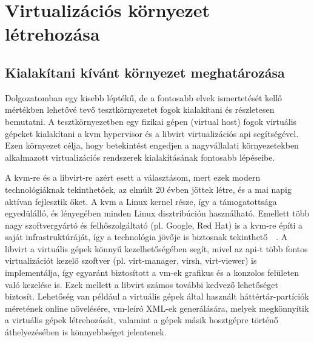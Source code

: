 
\chapter{Virtualizációs környezet létrehozása}
\label{chap:testenv}

\section{Kialakítani kívánt környezet meghatározása}
Dolgozatomban egy kisebb léptékű, de a fontosabb elvek ismertetését kellő mértékben lehetővé tevő tesztkörnyezetet fogok kialakítani és részletesen bemutatni. A tesztkörnyezetben egy fizikai gépen (virtual host) fogok virtuális gépeket kialakítani a \acrshort{kvm} \gls{hypervisor} és a \gls{libvirt} virtualizációs \acrshort{api} segítségével. Ezen környezet célja, hogy betekintést engedjen a nagyvállalati környezetekben alkalmazott virtualizációs rendszerek kialakításának fontosabb lépéseibe.

A \acrshort{kvm}-re és a \gls{libvirt}-re azért esett a választásom, mert ezek modern technológiáknak tekinthetőek, az elmúlt 20 évben jöttek létre, és a mai napig aktívan fejlesztik őket. A \acrshort{kvm} a Linux kernel része, így a támogatottsága egyedülálló, és lényegében minden Linux disztribúción használható. Emellett több nagy szoftvergyártó és felhőszolgáltató (pl. Google, Red Hat) is a \acrshort{kvm}-re építi a saját infrastruktúráját, így a technológia jövője is biztosnak tekinthető~\cite{RedHatVirtKVM}~\cite{GoogleCloudKVM}. A \gls{libvirt} a virtuális gépek könnyű kezelhetőségében segít, mivel az \acrshort{api}-t több fontos virtualizációt kezelő szoftver (pl. virt-manager, virsh, virt-viewer) is implementálja, így egyaránt biztosított a \acrshort{vm}-ek grafikus és a konzolos felületen való kezelése is.
Ezek mellett a \gls{libvirt} számos további kedvező lehetőséget biztosít. Lehetőség van például a virtuális gépek által használt háttértár-partíciók méretének online növelésére, \acrshort{vm}-leíró XML-ek generálására, melyek megkönnyítik a virtuális gépek létrehozását, valamint a gépek másik hosztgépre történő áthelyezésében is könnyebbséget jelentenek.

